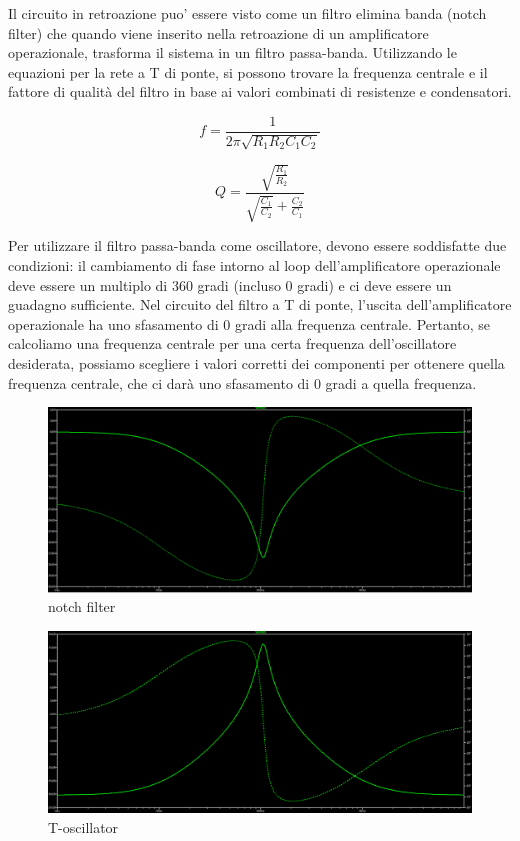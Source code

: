 \documentclass{article}
\begin{document}
Il circuito in retroazione puo' essere visto come un filtro elimina banda  (notch filter) 
che quando viene inserito nella retroazione di un amplificatore operazionale, trasforma il sistema in un filtro passa-banda. Utilizzando le equazioni per la rete a T di ponte, si possono trovare la frequenza centrale e il fattore di qualità del filtro in base ai valori combinati di resistenze e condensatori.

\begin{equation}
    f = \frac{1}{2 \pi\sqrt{R_1 R_2 C_1 C_2}}
\end{equation}

\begin{equation}
    Q = \frac{\sqrt{\frac{R_1}{R_2}}}{\sqrt{\frac{C_1}{C_2}} + {\frac{C_2}{C_1}}}
\end{equation}


Per utilizzare il filtro passa-banda come oscillatore, devono essere soddisfatte due condizioni: il cambiamento di fase intorno al loop dell'amplificatore operazionale deve essere un multiplo di 360 gradi (incluso 0 gradi) e ci deve essere un guadagno sufficiente.
Nel circuito del filtro a T di ponte, l'uscita dell'amplificatore operazionale ha uno sfasamento di 0 gradi alla frequenza centrale. Pertanto, se calcoliamo una frequenza centrale per una certa frequenza dell'oscillatore desiderata, possiamo scegliere i valori corretti dei componenti per ottenere quella frequenza centrale, che ci darà uno sfasamento di 0 gradi a quella frequenza. 

\begin{figure}[htp]
    \centering
    \includegraphics[width=\textwidth]{notch2.png} 
    \caption{notch filter}
    \label{fig:Notch-filter}
\end{figure}

\begin{figure}[htp]
    \centering
    \includegraphics[width=\textwidth]{toscillatorefrequency.png} 
    \caption{T-oscillator}
    \label{fig:Toscillator-plot}
\end{figure}
\end{document}
